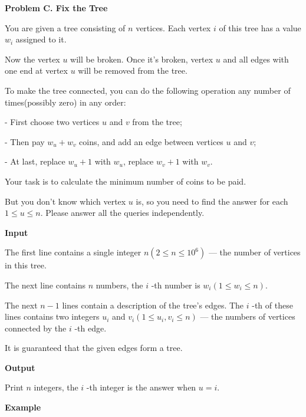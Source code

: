 \documentclass[a4paper]{article}
\begin{document}
\newpage


\textbf{\Large\textsf{Problem C. Fix the Tree}}
\vspace{0.01\textheight}

You are given a tree consisting of $n$ vertices. Each vertex $i$ of this tree has a value $w_i$ assigned to it.

Now the vertex $u$ will be broken. Once it's broken, vertex $u$ and all edges with one end at vertex $u$ will be removed from the tree.

To make the tree connected, you can do the following operation any number of times(possibly zero) in any order:

- First choose two vertices $u$ and $v$ from the tree;

- Then pay $w_u+w_v$ coins, and add an edge between vertices $u$ and $v$;

- At last, replace $w_u+1$ with $w_u$, replace $w_v+1$ with $w_v$.

Your task is to calculate the minimum number of coins to be paid.

But you don't know which vertex $u$ is, so you need to find the answer for each $1\le u\le n$. Please answer all the queries independently.

\vspace{0.01\textheight}
\textbf{\textsf{Input}}
\vspace{0.01\textheight}

The first line contains a single integer $n(2\le n\le 10^6)$ --- the number of vertices in this tree.

The next line contains $n$ numbers, the $i$ -th number is $w_i(1\le w_i\le n)$.

The next $n-1$ lines contain a description of the tree's edges. The $i$ -th of these lines contains two integers $u_i$ and $v_i(1\le u_i,v_i\le n) $ --- the numbers of vertices connected by the $i$ -th edge.

It is guaranteed that the given edges form a tree.

\vspace{0.01\textheight}
\textbf{\textsf{Output}}
\vspace{0.01\textheight}

Print $n$ integers, the $i$ -th integer is the answer when $u=i$.

\vspace{0.01\textheight}
\textbf{\textsf{Example}}
\vspace{0.01\textheight}
\end{document}
